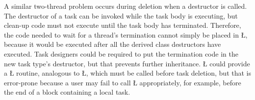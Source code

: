 \documentclass[openright,twoside]{report}
\begin{document}
A similar two-thread problem occurs during deletion when a destructor is called.
The destructor of a task can be invoked while the task body is executing, but clean-up code must not execute until the task body has terminated.
Therefore, the code needed to wait for a thread's termination cannot simply be placed in \LGinlinetrue\LGbegin\lgrinde\L{}\endlgrinde\LGend{}, because it would be executed after all the derived class destructors have executed.
Task designers could be required to put the termination code in the new task type's destructor, but that prevents further inheritance.
\LGinlinetrue\LGbegin\lgrinde\L{}\endlgrinde\LGend{} could provide a \LGinlinetrue\LGbegin\lgrinde\L{}\endlgrinde\LGend{} routine, analogous to \LGinlinetrue\LGbegin\lgrinde\L{}\endlgrinde\LGend{}, which must be called before task deletion, but that is error-prone because a user may fail to call \LGinlinetrue\LGbegin\lgrinde\L{}\endlgrinde\LGend{} appropriately, for example, before the end of a block containing a local task.
\end{document}
